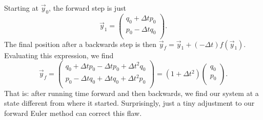 \documentclass{article}
\begin{document}
Starting at $\vec{y}_0$, the forward step is just 
\begin{equation}
    \vec{y}_1 = \begin{pmatrix}
    q_0 + \Delta t p_0\\
    p_0 - \Delta t q_0\\
    \end{pmatrix}.
\end{equation}
The final position after a backwards step is then $\vec{y}_f = \vec{y}_1 +(-\Delta t) f(\vec{y}_1)$.
Evaluating this expression, we find
\begin{equation}
    \vec{y}_f = \begin{pmatrix}
    q_0 + \Delta t p_0 - \Delta t p_0 + \Delta t^2 q_0\\
    p_0 - \Delta t q_0 + \Delta t q_0 + \Delta t^2 p_0\\
    \end{pmatrix}
    = (1+\Delta t^2) \begin{pmatrix}
    q_0\\
    p_0\\
    \end{pmatrix}.
\end{equation}
That is: after running time forward and then backwards, we find our system at a state different from where it started.
Surprisingly, just a tiny adjustment to our forward Euler method can correct this flaw.
\end{document}
